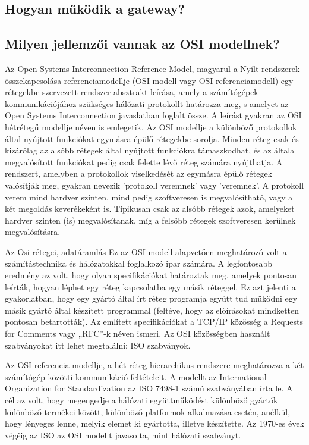 \documentclass[12pt, a4paper]{article}
\begin{document}
\subsection{Hogyan működik a gateway?}
\subsection{Milyen jellemzői vannak az OSI modellnek?}
Az Open Systems Interconnection Reference Model, magyarul a Nyílt rendszerek összekapcsolása referenciamodellje (OSI-modell vagy OSI-referenciamodell) egy rétegekbe szervezett rendszer absztrakt leírása, amely a számítógépek kommunikációjához szükséges hálózati protokollt határozza meg, s amelyet az Open Systems Interconnection javaslatban foglalt össze. A leírást gyakran az OSI hétrétegű modellje néven is emlegetik. Az OSI modellje a különböző protokollok által nyújtott funkciókat egymásra épülő rétegekbe sorolja. Minden réteg csak és kizárólag az alsóbb rétegek által nyújtott funkciókra támaszkodhat, és az általa megvalósított funkciókat pedig csak felette lévő réteg számára nyújthatja. A rendszert, amelyben a protokollok viselkedését az egymásra épülő rétegek valósítják meg, gyakran nevezik 'protokoll veremnek' vagy 'veremnek'. A protokoll verem mind hardver szinten, mind pedig szoftveresen is megvalósítható, vagy a két megoldás keverékeként is. Tipikusan csak az alsóbb rétegek azok, amelyeket hardver szinten (is) megvalósítanak, míg a felsőbb rétegek szoftveresen kerülnek megvalósításra.


 


 Az Osi rétegei, adatáramlás
Ez az OSI modell alapvetően meghatározó volt a számítástechnika és hálózatokkal foglalkozó ipar számára. A legfontosabb eredmény az volt, hogy olyan specifikációkat határoztak meg, amelyek pontosan leírták, hogyan léphet egy réteg kapcsolatba egy másik réteggel. Ez azt jelenti a gyakorlatban, hogy egy gyártó által írt réteg programja együtt tud működni egy másik gyártó által készített programmal (feltéve, hogy az előírásokat mindketten pontosan betartották). Az említett specifikációkat a TCP/IP közösség a Requests for Comments vagy „RFC”-k néven ismeri. Az OSI közösségben használt szabványokat itt lehet megtalálni: ISO szabványok.

Az OSI referencia modellje, a hét réteg hierarchikus rendszere meghatározza a két számítógép közötti kommunikáció feltételeit. A modellt az International Organization for Standardization az ISO 7498-1 számú szabványában írta le. A cél az volt, hogy megengedje a hálózati együttműködést különböző gyártók különböző termékei között, különböző platformok alkalmazása esetén, anélkül, hogy lényeges lenne, melyik elemet ki gyártotta, illetve készítette. Az 1970-es évek végéig az ISO az OSI modellt javasolta, mint hálózati szabványt.
\end{document}
